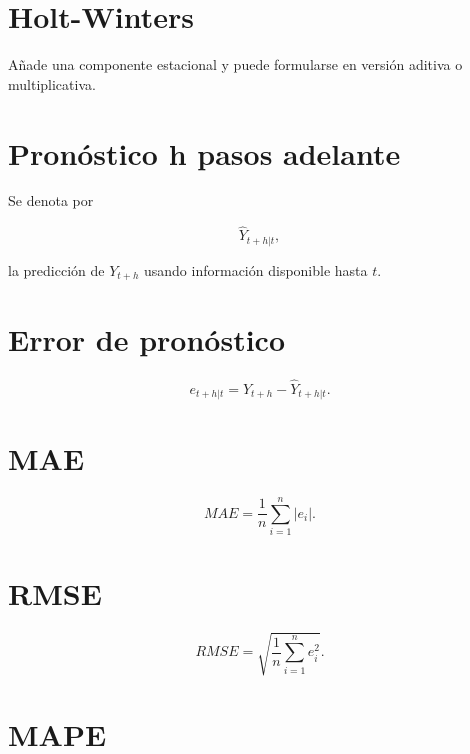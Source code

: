 \documentclass[
  spanish,
  10.5pt,
  letterpaper,
  DIV=11,
  numbers=noendperiod,
  oneside,
  open=any]{scrreprt}
\theoremstyle{definition}
\theoremstyle{definition}
\theoremstyle{plain}
\theoremstyle{remark}
\begin{document}
\section*{Holt-Winters}\label{holt-winters}


Añade una componente estacional y puede formularse en versión aditiva o
multiplicativa.

\section*{Pronóstico h pasos
adelante}\label{pronuxf3stico-h-pasos-adelante}


Se denota por

\[
\widehat{Y}_{t+h|t},
\]

la predicción de \(Y_{t+h}\) usando información disponible hasta \(t\).

\section*{Error de pronóstico}\label{error-de-pronuxf3stico}


\[
e_{t+h|t}
=
Y_{t+h}
-
\widehat{Y}_{t+h|t}.
\]

\section*{MAE}\label{mae}


\[
MAE
=
\frac{1}{n}
\sum_{i=1}^{n}|e_i|.
\]

\section*{RMSE}\label{rmse}


\[
RMSE
=
\sqrt{
\frac{1}{n}
\sum_{i=1}^{n}e_i^2
}.
\]

\section*{MAPE}\label{mape}
\end{document}
